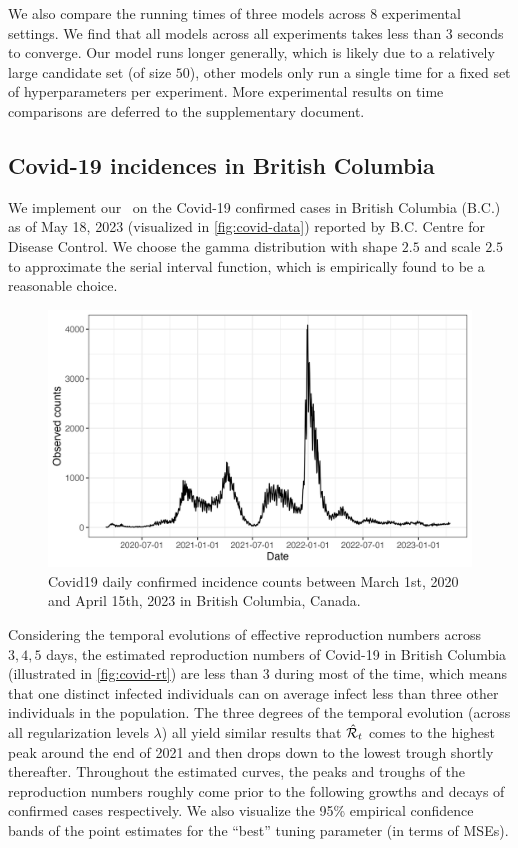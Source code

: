 We also compare the running times of three models across $8$ experimental settings. We find that all models across all experiments takes less than $3$ seconds to converge. Our model runs longer generally, which is likely due to a relatively large candidate set (of size $50$), other models only run a single time for a fixed set of hyperparameters per experiment. 
More experimental results on time comparisons are deferred to the supplementary document. 


\subsection{Covid-19 incidences in British Columbia}

We implement our \RtEstim\ on the Covid-19 confirmed cases in British Columbia (B.C.) as of May 18, 2023 (visualized in \autoref{fig:covid-data}) reported by B.C. Centre for Disease Control. We choose the gamma distribution with shape $2.5$ and scale $2.5$ to approximate the serial interval function, which is empirically found to be a reasonable choice. 
\begin{figure}[tb]
    \centering
    \includegraphics[width=0.99\linewidth]{fig/covid_dat.png}
    \caption{Covid19 daily confirmed incidence counts between March 1st, 2020 and April 15th, 2023 in British Columbia, Canada.} 
    \label{fig:covid-data}
\end{figure} 

Considering the temporal evolutions of effective reproduction numbers across $3, 4, 5$ days, the estimated reproduction numbers of Covid-19 in British Columbia (illustrated in \autoref{fig:covid-rt}) are less than $3$ during most of the time, which means that one distinct infected individuals can on average infect less than three other individuals in the population. The three degrees of the temporal evolution (across all regularization levels $\lambda$) all yield similar results that $\hat{\mathcal{R}}_t$ comes to the highest peak around the end of 2021 and then drops down to the lowest trough shortly thereafter. Throughout the estimated curves, the peaks and troughs of the reproduction numbers roughly come prior to the following growths and decays of confirmed cases respectively.
We also visualize the 95\% empirical confidence bands of the point estimates for the ``best'' tuning parameter (in terms of MSEs). 


